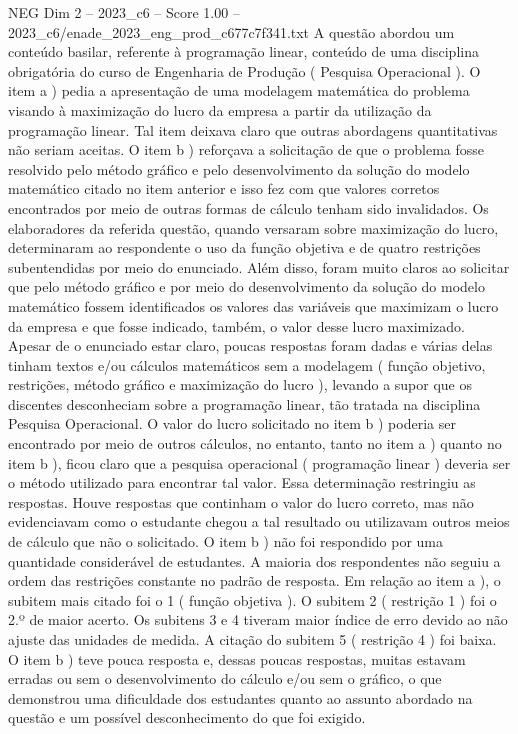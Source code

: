 \begin{textsample}{NEG Dim 2 – 2023\_c6 – Score 1.00 – 2023\_c6/enade\_2023\_eng\_prod\_c677c7f341.txt}
A questão abordou um conteúdo basilar, referente à programação linear, conteúdo de uma disciplina obrigatória do curso de Engenharia de Produção ( Pesquisa Operacional ).
O item a ) pedia a apresentação de uma modelagem matemática do problema visando à maximização do lucro da empresa a partir da utilização da programação linear.
Tal item deixava claro que outras abordagens quantitativas não seriam aceitas.
O item b ) reforçava a solicitação de que o problema fosse resolvido pelo método gráfico e pelo desenvolvimento da solução do modelo matemático citado no item anterior e isso fez com que valores corretos encontrados por meio de outras formas de cálculo tenham sido invalidados.
Os elaboradores da referida questão, quando versaram sobre maximização do lucro, determinaram ao respondente o uso da função objetiva e de quatro restrições subentendidas por meio do enunciado.
Além disso, foram muito claros ao solicitar que pelo método gráfico e por meio do desenvolvimento da solução do modelo matemático fossem identificados os valores das variáveis que maximizam o lucro da empresa e que fosse indicado, também, o valor desse lucro maximizado.
Apesar de o enunciado estar claro, poucas respostas foram dadas e várias delas tinham textos e/ou cálculos matemáticos sem a modelagem ( função objetivo, restrições, método gráfico e maximização do lucro ), levando a supor que os discentes desconheciam sobre a programação linear, tão tratada na disciplina Pesquisa Operacional.
O valor do lucro solicitado no item b ) poderia ser encontrado por meio de outros cálculos, no entanto, tanto no item a ) quanto no item b ), ficou claro que a pesquisa operacional ( programação linear ) deveria ser o método utilizado para encontrar tal valor.
Essa determinação restringiu as respostas.
Houve respostas que continham o valor do lucro correto, mas não evidenciavam como o estudante chegou a tal resultado ou utilizavam outros meios de cálculo que não o solicitado.
O item b ) não foi respondido por uma quantidade considerável de estudantes.
A maioria dos respondentes não seguiu a ordem das restrições constante no padrão de resposta.
Em relação ao item a ), o subitem mais citado foi o 1 ( função objetiva ).
O subitem 2 ( restrição 1 ) foi o 2.º de maior acerto.
Os subitens 3 e 4 tiveram maior índice de erro devido ao não ajuste das unidades de medida.
A citação do subitem 5 ( restrição 4 ) foi baixa.
O item b ) teve pouca resposta e, dessas poucas respostas, muitas estavam erradas ou sem o desenvolvimento do cálculo e/ou sem o gráfico, o que demonstrou uma dificuldade dos estudantes quanto ao assunto abordado na questão e um possível desconhecimento do que foi exigido.

\end{textsample}
